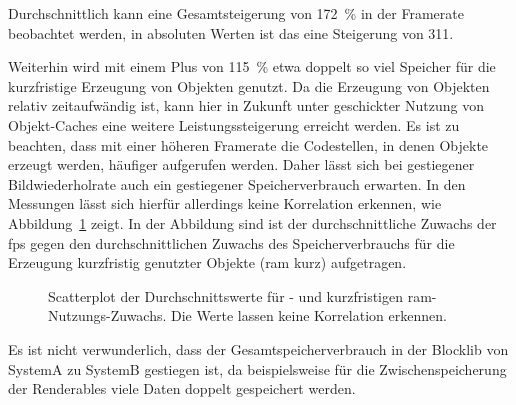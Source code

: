 Durchschnittlich kann eine Gesamtsteigerung von \SI{172}{\percent} in der Framerate beobachtet werden, in absoluten Werten ist das eine Steigerung von \SI{311}{\fps}.

Weiterhin wird mit einem Plus von \SI{115}{\percent} etwa doppelt so viel Speicher für die kurzfristige Erzeugung von Objekten genutzt. Da die Erzeugung von Objekten relativ zeitaufwändig ist, kann hier in Zukunft unter geschickter Nutzung von Objekt-Caches eine weitere Leistungssteigerung erreicht werden. Es ist zu beachten, dass mit einer höheren Framerate die Codestellen, in denen Objekte erzeugt werden, häufiger aufgerufen werden. Daher lässt sich bei gestiegener Bildwiederholrate auch ein gestiegener Speicherverbrauch erwarten. In den Messungen lässt sich hierfür allerdings keine Korrelation erkennen, wie Abbildung~\ref{fig:Scatterplot} zeigt. In der Abbildung sind ist der durchschnittliche Zuwachs der \ac{fps} gegen den durchschnittlichen Zuwachs des Speicherverbrauchs für die Erzeugung kurzfristig genutzter Objekte (\ac{ram} kurz) aufgetragen. 
\begin{figure}
	\centering
		\caption[Scatterplot der Durchschnittswerte für - und kurzfristigen -Nutzungs-Zuwachs.]{Scatterplot der Durchschnittswerte für \si{\fps}- und kurzfristigen \ac{ram}-Nutzungs-Zuwachs. Die Werte lassen keine Korrelation erkennen.}\label{fig:Scatterplot}
\end{figure}

Es ist nicht verwunderlich, dass der Gesamtspeicherverbrauch in der Blocklib von SystemA zu SystemB gestiegen ist, da beispielsweise für die Zwischenspeicherung der Renderables viele Daten doppelt gespeichert werden. 